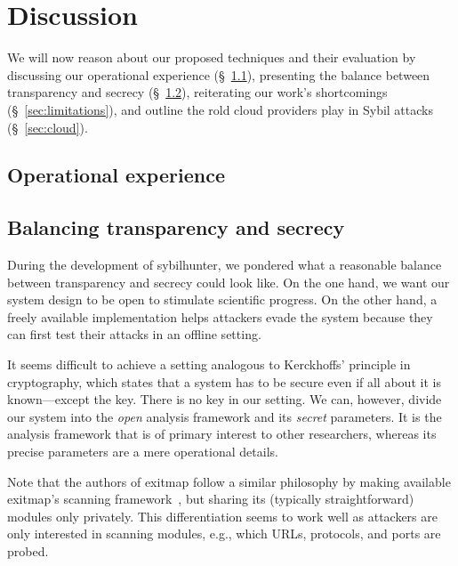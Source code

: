 \section{Discussion}
\label{sec:discussion}
We will now reason about our proposed techniques and their evaluation by
discussing our operational experience (\S~\ref{sec:operational}), presenting the
balance between transparency and secrecy (\S~\ref{sec:secrecy}), reiterating
our work's shortcomings (\S~\ref{sec:limitations}), and outline the rold cloud
providers play in Sybil attacks (\S~\ref{sec:cloud}).

\subsection{Operational experience}
\label{sec:operational}




\subsection{Balancing transparency and secrecy}
\label{sec:secrecy}
During the development of sybilhunter, we pondered what a reasonable balance
between transparency and secrecy could look like.  On the one hand, we want our
system design to be open to stimulate scientific progress.  On the other hand,
a freely available implementation helps attackers evade the system because they
can first test their attacks in an offline setting.

It seems difficult to achieve a setting analogous to Kerckhoffs' principle in
cryptography, which states that a system has to be secure even if all about it
is known---except the key.  There is no key in our setting.  We can, however,
divide our system into the \emph{open} analysis framework and its \emph{secret}
parameters.  It is the analysis framework that is of primary interest to other
researchers, whereas its precise parameters are a mere operational details.

Note that the authors of exitmap follow a similar philosophy by making
available exitmap's scanning framework~\cite{exitmap}, but sharing its
(typically straightforward) modules only privately.  This differentiation seems
to work well as attackers are only interested in scanning modules, e.g., which
URLs, protocols, and ports are probed.


